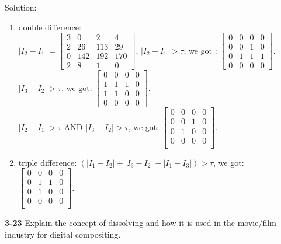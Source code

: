 \documentclass[a4paper]{article}
\begin{document}
\begin{spacing}{2.0}
	Solution: 
	\begin{enumerate}
	\item double difference:\\

	         $|I_2 - I_1| = \begin{bmatrix} 3 & 0 & 2 & 4 \\ 2 & 26 & 113 & 29 \\ 0 & 142 & 192 & 170 \\2 & 8 & 1 & 0 \end{bmatrix}$, $|I_2 - I_1|>\tau$, we got : $ \begin{bmatrix} 0 & 0 & 0 			& 0 \\ 0 & 0 & 1 & 0 \\ 0 & 1 & 1 & 1 \\0 & 0 & 0 & 0 \end{bmatrix}$.\\

	         $|I_3 - I_2|>\tau$, we got: $\begin{bmatrix} 0 & 0 & 0 & 0 \\ 1 & 1 & 1 & 0 \\ 1 & 1 & 0 & 0 \\0 & 0 & 0 & 0 \end{bmatrix}$.\\
 
	         $|I_2 - I_1| >\tau$ AND $|I_3 - I_2|>\tau$, we got: $\begin{bmatrix} 0 & 0 & 0 & 0\\  0 & 0 & 1 & 0\\  0 & 1 & 0 & 0\\  0 & 0 & 0 & 0\\ \end{bmatrix}$.\\

	\item triple difference: $(|I_1 - I_2| + |I_3 - I_2| - |I_1 - I_3|) > \tau$, we got:  $\begin{bmatrix} 0 & 0 & 0 & 0\\  0 & 1 & 1 & 0\\  0 & 1 & 0 & 0\\  0 & 0 & 0 & 0\\ \end{bmatrix}$.\\
	\end{enumerate}
		

	\noindent
	\textbf{3-23} Explain the concept of dissolving and how it is used in the movie/film industry for digital compositing.\\


\end{spacing}
\end{document}
